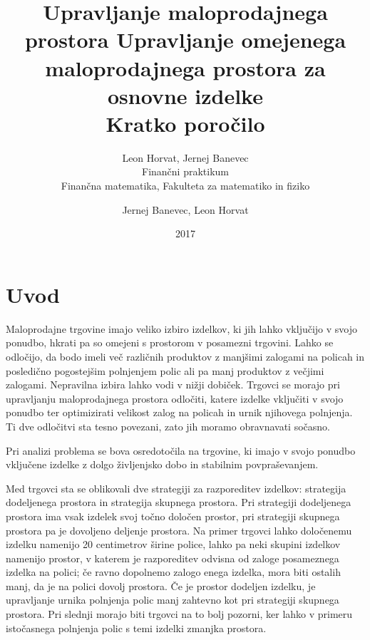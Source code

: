 \documentclass[a4paper]{article}
\title{Upravljanje maloprodajnega prostora}
\author{Leon Horvat, Jernej Banevec \\ Finančni praktikum \\ Finančna matematika, Fakulteta za matematiko in fiziko}
\date{2017}
\begin{document}
\title{%
  Upravljanje omejenega maloprodajnega prostora za osnovne izdelke \\
  \large Kratko poročilo \\}

\author{Jernej Banevec, Leon Horvat}

\maketitle

\pagebreak

\section{Uvod}


Maloprodajne trgovine imajo veliko izbiro izdelkov, ki jih lahko vključijo v svojo ponudbo, hkrati pa so omejeni s prostorom v posamezni trgovini. Lahko se odločijo, da bodo imeli več različnih produktov z manjšimi zalogami na policah in posledično pogostejšim polnjenjem polic ali pa manj produktov z večjimi zalogami. Nepravilna izbira lahko vodi v nižji dobiček. Trgovci se morajo pri upravljanju maloprodajnega prostora odločiti, katere izdelke vključiti v svojo ponudbo ter optimizirati velikost zalog na policah in urnik njihovega polnjenja. Ti dve odločitvi sta tesno povezani, zato jih moramo obravnavati sočasno. 


Pri analizi problema se bova osredotočila na trgovine, ki imajo v svojo ponudbo vključene izdelke z dolgo življenjsko dobo in stabilnim povpraševanjem. 

Med trgovci sta se oblikovali dve strategiji za razporeditev izdelkov: strategija dodeljenega prostora in strategija skupnega prostora. Pri strategiji dodeljenega prostora ima vsak izdelek svoj točno določen prostor, pri strategiji skupnega prostora pa je dovoljeno deljenje prostora. Na primer trgovci lahko določenemu izdelku namenijo 20 centimetrov širine police, lahko pa neki skupini izdelkov namenijo prostor, v katerem je razporeditev odvisna od zaloge posameznega izdelka na polici; če ravno dopolnemo zalogo enega izdelka, mora biti ostalih manj, da je na polici dovolj prostora. Če je prostor dodeljen izdelku, je upravljanje urnika polnjenja polic manj zahtevno kot pri strategiji skupnega prostora. Pri slednji morajo biti trgovci na to bolj pozorni, ker lahko v primeru istočasnega polnjenja polic s temi izdelki zmanjka prostora. 

\vspace{4 mm}
\end{document}
